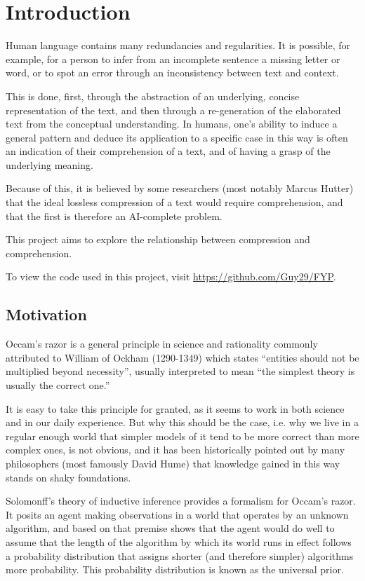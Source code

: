 \chapter{Introduction}

Human language contains many redundancies and regularities. It is possible, for example, for a person to infer from an incomplete sentence a missing letter or word, or to spot an error through an inconsistency between text and context.

This is done, first, through the abstraction of an underlying, concise representation of the text, and then through a re-generation of the elaborated text from the conceptual understanding. In humans, one's ability to induce a general pattern and deduce its application to a specific case in this way is often an indication of their comprehension of a text, and of having a grasp of the underlying meaning.

Because of this, it is believed by some researchers (most notably Marcus Hutter) that the ideal lossless compression of a text would require comprehension, and that the first is therefore an AI-complete problem.

This project aims to explore the relationship between compression and comprehension.

To view the code used in this project, visit \url{https://github.com/Guy29/FYP}.

\section{Motivation}
\label{subsec:motivation}

Occam’s razor is a general principle in science and rationality commonly attributed to William of Ockham (1290-1349) which states “entities should not be multiplied beyond necessity”, usually interpreted to mean “the simplest theory is usually the correct one.”

It is easy to take this principle for granted, as it seems to work in both science and in our daily experience. But why this should be the case, i.e. why we live in a regular enough world that simpler models of it tend to be more correct than more complex ones, is not obvious, and it has been historically pointed out by many philosophers (most famously David Hume) that knowledge gained in this way stands on shaky foundations. \autocite{Henderson2018}

Solomonff’s theory of inductive inference provides a formalism for Occam’s razor. It posits an agent making observations in a world that operates by an unknown algorithm, and based on that premise shows that the agent would do well to assume that the length of the algorithm by which its world runs in effect follows a probability distribution that assigns shorter (and therefore simpler) algorithms more probability. This probability distribution is known as the universal prior.

